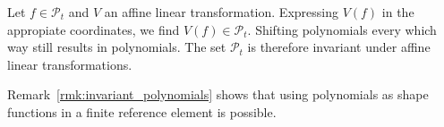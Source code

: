 \begin{remark}{\quad\label{rmk:invariant_polynomials}}
   Let $f\in\mathcal{P}_t$ and $V$ an affine linear transformation. 
   Expressing $V(f)$ in the appropiate coordinates, we find 
   $V(f)\in\mathcal{P}_t$. Shifting polynomials every which way 
   still results in polynomials. The set $\mathcal{P}_t$ is 
   therefore invariant under affine linear transformations.
\end{remark}
Remark~\ref{rmk:invariant_polynomials} shows that using polynomials 
as shape functions in a finite reference element is possible.
